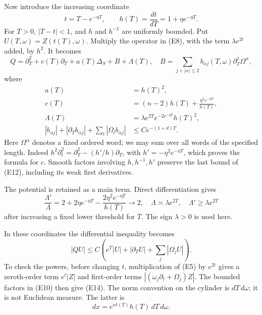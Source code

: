 \documentclass[
  11pt,
]{article}
\begin{document}
Now introduce the increasing coordinate \[
 t=T-e^{-\eta T},\qquad h(T)=\frac{dt}{dT}=1+\eta e^{-\eta T}.
                                                                    \tag{E10}
\] For \(T>0\), \(|T-t|<1\), and \(h\) and \(h^{-1}\) are uniformly
bounded. Put \(U(T,\omega)=Z(t(T),\omega)\). Multiply the operator in
(E8), with the term \(\lambda e^{2t}\) added, by \(h^2\). It becomes \[
 Q=\partial_T^2+c(T)\partial_T+a(T)\Delta_S+B+\Lambda(T),
 \quad B=\sum_{j+|\alpha|\leq2}b_{\alpha j}(T,\omega)
                                     \partial_T^j\Omega^\alpha,
                                                                    \tag{E11}
\] where \[
\begin{split}
 a(T)&=h(T)^2,\\
 c(T)&=(n-2)h(T)+\frac{\eta^2e^{-\eta T}}{h(T)},\\
 \Lambda(T)&=\lambda e^{2T}e^{-2e^{-\eta T}}h(T)^2,\\
 |b_{\alpha j}|+|\partial_Tb_{\alpha j}|+
                  \sum_l|\Omega_lb_{\alpha j}|&\leq C e^{-(1+d)T}.
\end{split}                                                       \tag{E12}
\] Here \(\Omega^\alpha\) denotes a fixed ordered word; we may sum over
all words of the specified length. Indeed
\(h^2\partial_t^2=\partial_T^2-(h'/h)\partial_T\), with
\(h'=-\eta^2e^{-\eta T}\), which proves the formula for \(c\). Smooth
factors involving \(h,h^{-1},h'\) preserve the last bound of (E12),
including its weak first derivatives.

The potential is retained as a main term. Direct differentiation gives
\[
 \frac{\Lambda'}{\Lambda}
 =2+2\eta e^{-\eta T}
           -\frac{2\eta^2e^{-\eta T}}{h(T)}\longrightarrow2,
 \quad
 \Lambda\asymp\lambda e^{2T},\quad
 \Lambda'\geq\lambda e^{2T}                                    \tag{E13}
\] after increasing a fixed lower threshold for \(T\). The sign
\(\lambda>0\) is used here.

In these coordinates the differential inequality becomes \[
 |QU|\leq C\left(e^T|U|+|\partial_TU|+
                                     \sum_j|\Omega_jU|\right).  \tag{E14}
\] To check the powers, before changing \(t\), multiplication of (E5) by
\(e^{2t}\) gives a zeroth-order term \(e^t|Z|\) and first-order terms
\(|(\omega_j\partial_t+\Omega_j)Z|\). The bounded factors in (E10) then
give (E14). The norm convention on the cylinder is \(dT\,d\omega\); it
is not Euclidean measure. The latter is \[
                         dx=e^{nt(T)}h(T)\,dT\,d\omega.          \tag{E15}
\]
\end{document}
